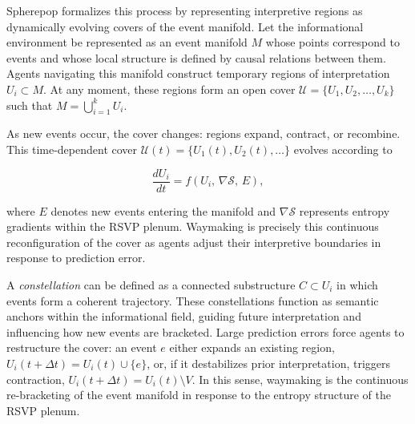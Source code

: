 \documentclass[12pt,a4paper]{article}
\begin{document}
Spherepop formalizes this process by representing interpretive regions as dynamically evolving
covers of the event manifold. Let the informational environment be represented as an event
manifold $M$ whose points correspond to events and whose local structure is defined by causal
relations between them. Agents navigating this manifold construct temporary regions of
interpretation $U_i \subset M$. At any moment, these regions form an open cover
$\mathcal{U} = \{U_1, U_2, \dots, U_k\}$ such that $M = \bigcup_{i=1}^k U_i$.

As new events occur, the cover changes: regions expand, contract, or recombine. This
time-dependent cover $\mathcal{U}(t) = \{U_1(t), U_2(t), \dots\}$ evolves according to

\[
\frac{dU_i}{dt} = f\!\left(U_i,\, \nabla\mathcal{S},\, E\right),
\]

where $E$ denotes new events entering the manifold and $\nabla\mathcal{S}$ represents entropy
gradients within the RSVP plenum. Waymaking is precisely this continuous reconfiguration of
the cover as agents adjust their interpretive boundaries in response to prediction error.

A \emph{constellation} can be defined as a connected substructure $C \subset U_i$ in which
events form a coherent trajectory. These constellations function as semantic anchors within
the informational field, guiding future interpretation and influencing how new events are
bracketed. Large prediction errors force agents to restructure the cover: an event $e$ either
expands an existing region, $U_i(t+\Delta t) = U_i(t) \cup \{e\}$, or, if it destabilizes
prior interpretation, triggers contraction, $U_i(t+\Delta t) = U_i(t) \setminus V$. In this
sense, waymaking is the continuous re-bracketing of the event manifold in response to the
entropy structure of the RSVP plenum.
\end{document}
